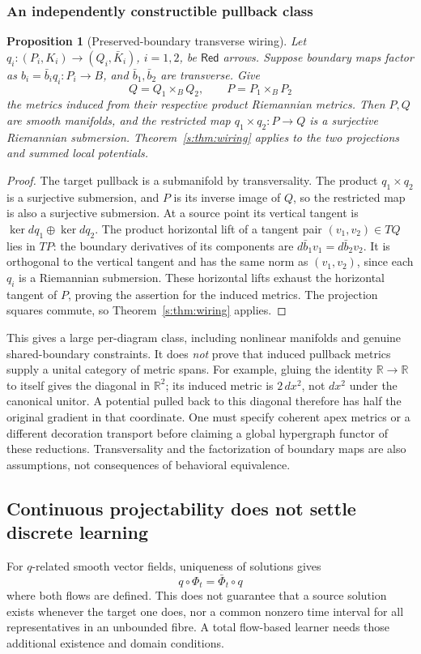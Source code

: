 \documentclass[11pt]{article}
\newtheorem{proposition}[theorem]{Proposition}
\theoremstyle{definition}
\theoremstyle{remark}\newtheorem{remark}[theorem]{Remark}
\newcommand{\R}{\mathbb R}
\newcommand{\Red}{\mathsf{Red}}
\begin{document}
\subsubsection{An independently constructible pullback class}
\begin{proposition}[Preserved-boundary transverse wiring]
\label{s:prop:pullback}
Let $q_i:(P_i,K_i)\to(Q_i,\bar K_i)$, $i=1,2$, be $\Red$ arrows.
Suppose boundary maps factor as
$b_i=\bar b_iq_i:P_i\to B$, and $\bar b_1,\bar b_2$ are transverse.
Give
\[
 Q=Q_1\times_BQ_2,\qquad P=P_1\times_BP_2
\]
the metrics induced from their respective product Riemannian metrics.
Then $P,Q$ are smooth manifolds, and the restricted map
$q_1\times q_2:P\to Q$ is a surjective Riemannian submersion.
Theorem~\ref{s:thm:wiring} applies to the two projections and summed local
potentials.
\end{proposition}
\begin{proof}
The target pullback is a submanifold by transversality. The product
$q_1\times q_2$ is a surjective submersion, and $P$ is its inverse image of
$Q$, so the restricted map is also a surjective submersion.
At a source point its vertical tangent is
$\ker dq_1\oplus\ker dq_2$. The product horizontal lift of a tangent pair
$(v_1,v_2)\in TQ$ lies in $TP$: the boundary derivatives of its components
are $d\bar b_1v_1=d\bar b_2v_2$. It is orthogonal to the vertical tangent
and has the same norm as $(v_1,v_2)$, since each $q_i$ is a Riemannian
submersion. These horizontal lifts exhaust the horizontal tangent of $P$,
proving the assertion for the induced metrics. The projection squares
commute, so Theorem~\ref{s:thm:wiring} applies.
\end{proof}

This gives a large per-diagram class, including nonlinear manifolds and
genuine shared-boundary constraints. It does \emph{not} prove that induced
pullback metrics supply a unital category of metric spans. For example,
gluing the identity $\R\to\R$ to itself gives the diagonal in
$\R^2$; its induced metric is $2\,dx^2$, not $dx^2$ under the canonical
unitor. A potential pulled back to this diagonal therefore has half the
original gradient in that coordinate. One must specify coherent apex
metrics or a different decoration transport before claiming a global
hypergraph functor of these reductions. Transversality and the factorization
of boundary maps are also assumptions, not consequences of behavioral
equivalence.

\subsection{Continuous projectability does not settle discrete learning}
For $q$-related smooth vector fields, uniqueness of solutions gives
\begin{equation}\label{s:eq:flow}
 q\circ\Phi_t=\bar\Phi_t\circ q
\end{equation}
where both flows are defined. This does not guarantee that a source solution
exists whenever the target one does, nor a common nonzero time interval for
all representatives in an unbounded fibre. A total flow-based learner needs
those additional existence and domain conditions.
\end{document}
